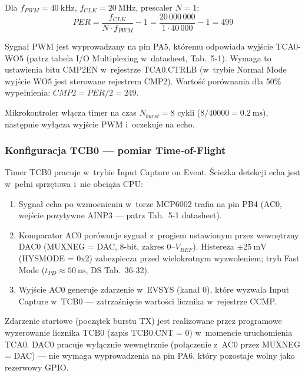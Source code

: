 \documentclass[a4paper,11pt]{article}
\begin{document}
Dla $f_{PWM} = \SI{40}{\kilo\hertz}$, $f_{CLK} = \SI{20}{\mega\hertz}$,
prescaler $N = 1$:
\begin{equation}
    PER = \frac{f_{CLK}}{N \cdot f_{PWM}} - 1 = \frac{20\,000\,000}{1 \cdot 40\,000} - 1 = 499
    \label{eq:per_value}
\end{equation}

Sygnał PWM jest wyprowadzany na pin PA5, któremu odpowiada wyjście TCA0-WO5
(patrz tabela I/O Multiplexing w~datasheet, Tab.~5-1). Wymaga to ustawienia
bitu CMP2EN w~rejestrze TCA0.CTRLB (w~trybie Normal Mode wyjście WO5
jest sterowane rejestrem CMP2).
Wartość porównania dla 50\% wypełnienia: $CMP2 = PER/2 = 249$.

Mikrokontroler włącza timer na czas $N_{burst} = 8$ cykli
($8/40000 = \SI{0,2}{\milli\second}$), następnie wyłącza wyjście PWM
i~oczekuje na echo.

\subsubsection{Konfiguracja TCB0 --- pomiar Time-of-Flight}

Timer TCB0 pracuje w~trybie Input Capture on Event. Ścieżka detekcji
echa jest w~pełni sprzętowa i~nie obciąża CPU:

\begin{enumerate}[nosep]
    \item Sygnał echa po wzmocnieniu w~torze MCP6002 trafia
          na pin PB4 (AC0, wejście pozytywne AINP3 --- patrz Tab.~5-1 datasheet).
    \item Komparator AC0 porównuje sygnał z~progiem ustawionym przez
          wewnętrzny DAC0 (MUXNEG = DAC, 8-bit, zakres 0--$V_{REF}$).
          Histereza $\pm\SI{25}{\milli\volt}$ (HYSMODE = 0x2) zabezpiecza
          przed wielokrotnym wyzwoleniem; tryb Fast Mode
          ($t_{PD} \approx \SI{50}{\nano\second}$, DS Tab.~36-32).
    \item Wyjście AC0 generuje zdarzenie w~EVSYS (kanał 0), które
          wyzwala Input Capture w~TCB0 --- zatrzaśnięcie wartości licznika
          w~rejestrze CCMP.
\end{enumerate}

Zdarzenie startowe (początek burstu TX) jest realizowane przez programowe
wyzerowanie licznika TCB0 (zapis TCB0.CNT = 0) w~momencie uruchomienia
TCA0. DAC0 pracuje wyłącznie wewnętrznie (połączenie z~AC0 przez
MUXNEG = DAC) --- nie wymaga wyprowadzenia na pin PA6, który pozostaje
wolny jako rezerwowy GPIO.
\end{document}
